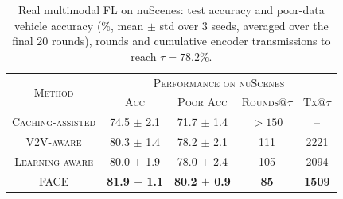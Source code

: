\begin{table}[t]
    \centering
    \caption{Real multimodal FL on nuScenes: test accuracy and poor-data vehicle accuracy (\%, mean $\pm$ std over 3 seeds, averaged over the final 20 rounds), rounds and cumulative encoder transmissions to reach $\tau=78.2\%$.}
    \label{tab:real_nuscenes}
    \renewcommand{\arraystretch}{1.15}
    \setlength{\tabcolsep}{4.5pt}
    \begin{tabular}{c|c|c|c|c}
        \hline
        \multirow{2}{*}{\textsc{Method}} & \multicolumn{4}{c}{\textsc{Performance on nuScenes}} \\
        & \textsc{Acc} & \textsc{Poor Acc} & \textsc{Rounds@$\tau$} & \textsc{Tx@$\tau$} \\
        \hline
        \textsc{Caching-assisted} & 74.5 $\pm$ 2.1 & 71.7 $\pm$ 1.4 & $>150$ & -- \\
        \textsc{V2V-aware} & 80.3 $\pm$ 1.4 & 78.2 $\pm$ 2.1 & 111 & 2221 \\
        \textsc{Learning-aware} & 80.0 $\pm$ 1.9 & 78.0 $\pm$ 2.4 & 105 & 2094 \\
        \hline
        \textsc{FACE} & \textbf{81.9 $\pm$ 1.1} & \textbf{80.2 $\pm$ 0.9} & \textbf{85} & \textbf{1509} \\
        \hline
    \end{tabular}
\end{table}
